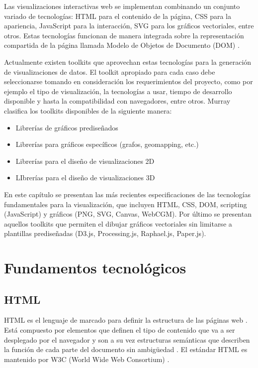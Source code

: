 Las visualizaciones interactivas web se implementan combinando un conjunto variado de tecnologías: HTML para el contenido de la página, CSS para la apariencia, JavaScript para la interacción, SVG para los gráficos vectoriales, entre otros. Estas tecnologías funcionan de manera integrada sobre la representación compartida de la página llamada Modelo de Objetos de Documento (DOM) \cite{Bos11}.

Actualmente existen toolkits que aprovechan estas tecnologías para la generación de visualizaciones de datos. El toolkit apropiado para cada caso debe seleccionarse tomando en consideración los requerimientos del proyecto, como por ejemplo el tipo de visualización, la tecnologías a usar, tiempo de desarrollo disponible y hasta la compatibilidad con navegadores, entre otros. Murray \cite{Mur13} clasifica los toolkits disponibles de la siguiente manera:

\begin{itemize}
  \item Librerías de gráficos prediseñados
  \item Librerías para gráficos específicos (grafos, geomapping, etc.)
  \item Librerías para el diseño de visualizaciones 2D
  \item LIbrerías para el diseño de visualizaciones 3D
\end{itemize}

En este capítulo se presentan las más recientes especificaciones de las tecnologías fundamentales para la visualización, que incluyen HTML, CSS, DOM, scripting (JavaScript) y gráficos (PNG, SVG, Canvas, WebCGM). Por último se presentan aquellos toolkits que permiten el dibujar gráficos vectoriales sin limitarse a plantillas prediseñadas (D3.js, Processing.js, Raphael.js, Paper.js).

\section{Fundamentos tecnológicos}

\subsection{HTML}

HTML es el lenguaje de marcado para definir la estructura de las páginas web \cite{HnC13}. Está compuesto por elementos que definen el tipo de contenido que va a ser desplegado por el navegador y son a su vez estructuras semánticas que describen la función de cada parte del documento sin ambigüedad \cite{Wp14}. El estándar HTML es mantenido por W3C (World Wide Web Consortium) \cite{MozHTML}.

